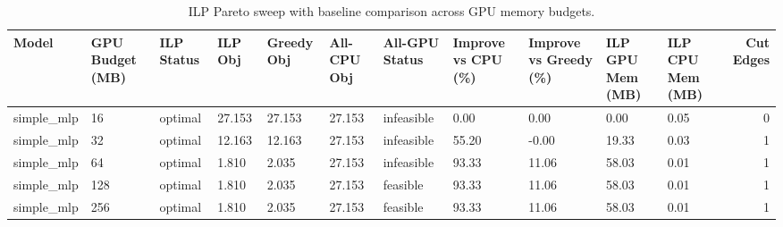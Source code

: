 \begin{table}[t]
\centering
\caption{ILP Pareto sweep with baseline comparison across GPU memory budgets.}
\label{tab:ilp-budget-sweep}
\begin{tabular}{lllllllllllr}
\toprule
Model & GPU Budget (MB) & ILP Status & ILP Obj & Greedy Obj & All-CPU Obj & All-GPU Status & Improve vs CPU (\%) & Improve vs Greedy (\%) & ILP GPU Mem (MB) & ILP CPU Mem (MB) & Cut Edges \\
\midrule
simple_mlp & 16 & optimal & 27.153 & 27.153 & 27.153 & infeasible & 0.00 & 0.00 & 0.00 & 0.05 & 0 \\
simple_mlp & 32 & optimal & 12.163 & 12.163 & 27.153 & infeasible & 55.20 & -0.00 & 19.33 & 0.03 & 1 \\
simple_mlp & 64 & optimal & 1.810 & 2.035 & 27.153 & infeasible & 93.33 & 11.06 & 58.03 & 0.01 & 1 \\
simple_mlp & 128 & optimal & 1.810 & 2.035 & 27.153 & feasible & 93.33 & 11.06 & 58.03 & 0.01 & 1 \\
simple_mlp & 256 & optimal & 1.810 & 2.035 & 27.153 & feasible & 93.33 & 11.06 & 58.03 & 0.01 & 1 \\
\bottomrule
\end{tabular}

\end{table}
